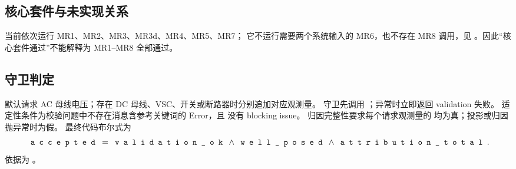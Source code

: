 \subsection{核心套件与未实现关系}

 当前依次运行 MR1、MR2、MR3、MR3d、MR4、MR5、MR7；
它不运行需要两个系统输入的 MR6，也不存在 MR8 调用，见
。因此“核心套件通过”不能解释为 MR1--MR8 全部通过。

\subsection{守卫判定}

默认请求 AC 母线电压；存在 DC 母线、VSC、开关或断路器时分别追加对应观测量。
守卫先调用 ；异常时立即返回 validation 失败。
适定性条件为校验问题中不存在消息含参考关键词的 Error，且
 没有 blocking issue。
归因完整性要求每个请求观测量的  均为真；投影或归因抛异常时为假。
最终代码布尔式为
\begin{equation}
 \fld{accepted}=\fld{validation\_ok}\land\fld{well\_posed}\land\fld{attribution\_total}.
\end{equation}
依据为 。
